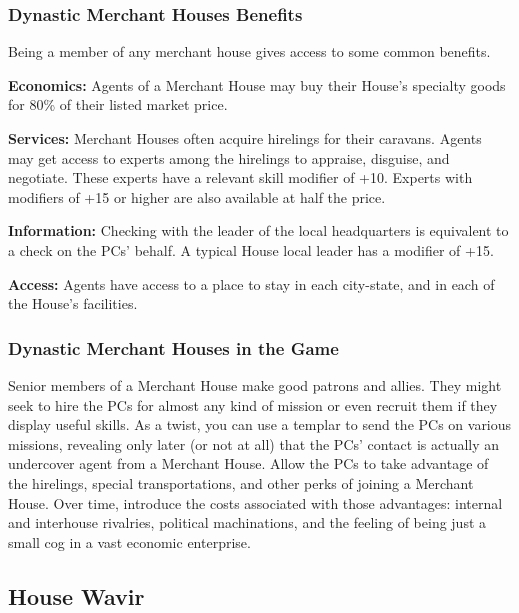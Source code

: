 \subsubsection{Dynastic Merchant Houses Benefits}
Being a member of any merchant house gives access to some common benefits.

\textbf{Economics:} Agents of a Merchant House may buy their House's specialty goods for 80\% of their listed market price.

\textbf{Services:} Merchant Houses often acquire hirelings for their caravans. Agents may get access to experts among the hirelings to appraise, disguise, and negotiate. These experts have a relevant skill modifier of +10. Experts with modifiers of +15 or higher are also available at half the price.

\textbf{Information:} Checking with the leader of the local headquarters is equivalent to a  check on the PCs' behalf. A typical House local leader has a  modifier of +15.

\textbf{Access:} Agents have access to a place to stay in each city-state, and in each of the House's facilities.

\subsubsection{Dynastic Merchant Houses in the Game}
Senior members of a Merchant House make good patrons and allies. They might seek to hire the PCs for almost any kind of mission or even recruit them if they display useful skills. As a twist, you can use a templar to send the PCs on various missions, revealing only later (or not at all) that the PCs' contact is actually an undercover agent from a Merchant House. Allow the PCs to take advantage of the hirelings, special transportations, and other perks of joining a Merchant House. Over time, introduce the costs associated with those advantages: internal and interhouse rivalries, political machinations, and the feeling of being just a small cog in a vast economic enterprise.








\subsection{House Wavir}